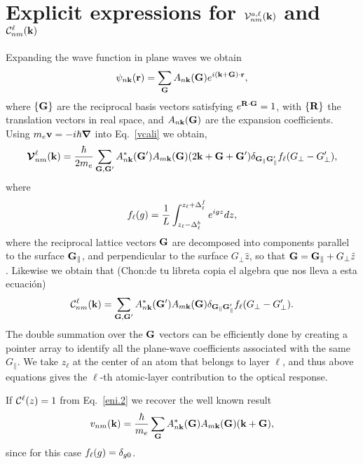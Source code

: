 \section{Explicit expressions for ${\cal V}^{a,\ell}_{nm}(\mathbf{k})$ 
and ${\cal C}^{\ell}_{nm}(\mathbf{k})$}\label{calpcalc}

Expanding the wave function in plane waves we obtain
\begin{eqnarray}\label{eni.1}
\psi_{n\mathbf{k}}(\mathbf{r})=\sum_{\mathbf{G}} A_{n\mathbf{k}}(\mathbf{G})e^{i(\mathbf{k}+\mathbf{G})\cdot\mathbf{r}}
,
\end{eqnarray}
where $\{\mathbf{G}\}$ are the reciprocal basis vectors satisfying
$e^{\mathbf{R}\cdot\mathbf{G}}=1$, with $\{\mathbf{R}\}$ the translation vectors in real
space, and $A_{n\mathbf{k}}(\mathbf{G})$ are the expansion coefficients. Using
$m_e\mathbf{v}=-i\hbar\boldsymbol{\nabla}$ into Eq.~\eqref{vcali} we obtain,\cite{mendozaPRB06}
\begin{eqnarray}\label{eni.2}
\boldsymbol{\mathcal{\cal V}}^\ell_{nm}(\mathbf{k})=
\frac{\hbar}{2m_e}
\sum_{\mathbf{G},\mathbf{G}'} A^*_{n\mathbf{k}}(\mathbf{G}')  A_{m\mathbf{k}}(\mathbf{G})
(2\mathbf{k}+\mathbf{G}+\mathbf{G}')
\delta_{\mathbf{G}_\parallel \mathbf{G}'_\parallel}  
f_\ell(G_\perp-G'_\perp)
,
\end{eqnarray}   
where
\begin{eqnarray}\label{eni.3}
f_\ell(g)=\frac{1}{L}\int_{z_\ell-\Delta^b_\ell}^{z_\ell+\Delta^f_\ell} e^{igz}dz
,
\end{eqnarray}
where the reciprocal lattice vectors $\mathbf{G}$ are decomposed into components
parallel to the surface $\mathbf{G}_\parallel$, and perpendicular to the
surface $G_\perp \hat z$, so
that $\mathbf{G} = \mathbf{G}_\parallel + G_\perp\hat z$.
Likewise we obtain that (Chon:de tu libreta copia el algebra que nos
lleva a esta ecuaci\'on)
\begin{eqnarray}\label{eni.4}
{\mathbf{\cal C}}^\ell_{nm}(\mathbf{k})=
\sum_{\mathbf{G},\mathbf{G}'} A^*_{n\mathbf{k}}(\mathbf{G}')  A_{m\mathbf{k}}(\mathbf{G})
\delta_{\mathbf{G}_\parallel \mathbf{G}'_\parallel}
f_\ell(G_\perp-G'_\perp)
.
\end{eqnarray} 
The double summation over the $\mathbf{G}$ vectors can be efficiently done by
creating a pointer array to identify all the plane-wave coefficients
associated with the same $G_\parallel$. We take $z_\ell$
 at the center of an atom that
belongs to layer $\ell$, and thus above equations gives the $\ell$-th
 atomic-layer
contribution to the optical response.\cite{mendozaPRB06} 

If ${\mathbf{\cal C}}^\ell(z)=1$ from Eq.~\eqref{eni.2} we recover the well known
result
\begin{eqnarray}\label{eni.21}
v_{nm}(\mathbf{k})=
\frac{\hbar}{m_e}
\sum_{\mathbf{G}} A^*_{n\mathbf{k}}(\mathbf{G})  A_{m\mathbf{k}}(\mathbf{G})
(\mathbf{k}+\mathbf{G})
,
\end{eqnarray}  
since for this case $f_\ell(g)=\delta_{g0}$.
